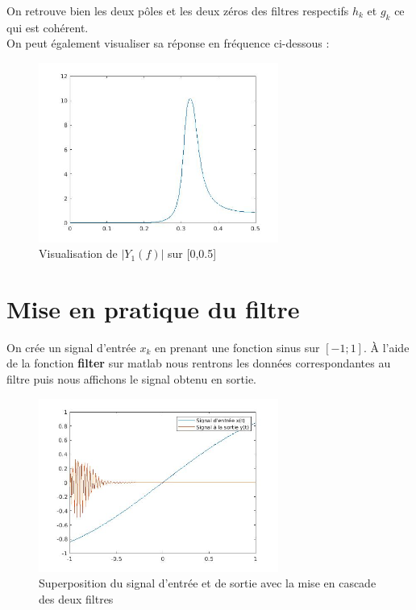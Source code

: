 \documentclass[12,french]{report}
\begin{document}
On retrouve bien les deux pôles et les deux zéros des filtres respectifs $h_k$ et $g_k$ ce qui est cohérent.\\

On peut également visualiser sa réponse en fréquence ci-dessous :

\begin{figure}[H]
	\center
	\includegraphics[width=0.7\textwidth]{./Images/freqz_Y1}
	\caption{Visualisation de $|Y_1(f)|$ sur [0,0.5]}
\end{figure}\vspace{0.2cm}


\section{Mise en pratique du filtre}

On crée un signal d'entrée $x_k$ en prenant une fonction sinus sur $[-1;1]$.
À l'aide de la fonction \textbf{filter} sur matlab nous rentrons les données correspondantes au filtre puis nous affichons le signal obtenu en sortie.
\begin{figure}[H]
	\center
	\includegraphics[width=0.7\textwidth]{./Images/filtercascade}
	\caption{Superposition du signal d'entrée et de sortie avec la mise en cascade des deux filtres}
\end{figure}\vspace{0.2cm}
\end{document}

